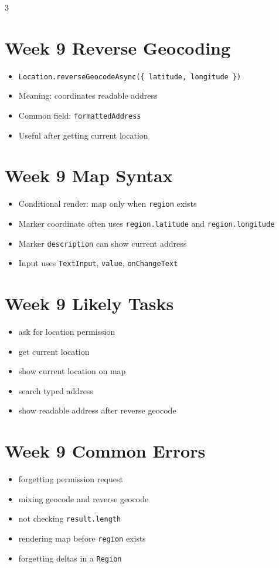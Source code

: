 \documentclass[10pt,letterpaper]{article}
\begin{document}
\begin{multicols}{3}
\section*{Week 9 Reverse Geocoding}
\begin{itemize}
  \item \texttt{Location.reverseGeocodeAsync(\{ latitude, longitude \})}
  \item Meaning: coordinates \textrightarrow{} readable address
  \item Common field: \texttt{formattedAddress}
  \item Useful after getting current location
\end{itemize}

\section*{Week 9 Map Syntax}
\begin{itemize}
  \item Conditional render: map only when \texttt{region} exists
  \item Marker coordinate often uses \texttt{region.latitude} and \texttt{region.longitude}
  \item Marker \texttt{description} can show current address
  \item Input uses \texttt{TextInput}, \texttt{value}, \texttt{onChangeText}
\end{itemize}

\section*{Week 9 Likely Tasks}
\begin{itemize}
  \item ask for location permission
  \item get current location
  \item show current location on map
  \item search typed address
  \item show readable address after reverse geocode
\end{itemize}

\section*{Week 9 Common Errors}
\begin{itemize}
  \item forgetting permission request
  \item mixing geocode and reverse geocode
  \item not checking \texttt{result.length}
  \item rendering map before \texttt{region} exists
  \item forgetting deltas in a \texttt{Region}
\end{itemize}


\end{multicols}
\end{document}
